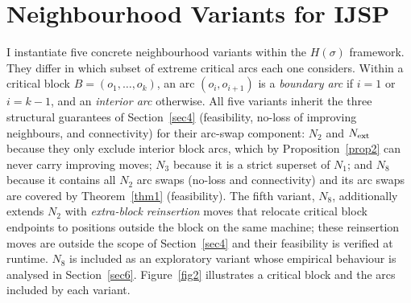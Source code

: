 \documentclass[preprint,12pt]{elsarticle}
\begin{document}
\section{Neighbourhood Variants for IJSP}
\label{sec5}

I instantiate five concrete neighbourhood variants within the $H(\sigma)$ framework. They differ in which subset of extreme critical arcs each one considers. Within a critical block $B = (o_1,\ldots,o_k)$, an arc $(o_i,o_{i+1})$ is a \emph{boundary arc} if $i=1$ or $i=k-1$, and an \emph{interior arc} otherwise. All five variants inherit the three structural guarantees of Section~\ref{sec4} (feasibility, no-loss of improving neighbours, and connectivity) for their arc-swap component: $N_2$ and $N_{\rm ext}$ because they only exclude interior block arcs, which by Proposition~\ref{prop2} can never carry improving moves; $N_3$ because it is a strict superset of $N_1$; and $N_8$ because it contains all $N_2$ arc swaps (no-loss and connectivity) and its arc swaps are covered by Theorem~\ref{thm1} (feasibility). The fifth variant, $N_8$, additionally extends $N_2$ with \emph{extra-block reinsertion} moves that relocate critical block endpoints to positions outside the block on the same machine; these reinsertion moves are outside the scope of Section~\ref{sec4} and their feasibility is verified at runtime. $N_8$ is included as an exploratory variant whose empirical behaviour is analysed in Section~\ref{sec6}. Figure~\ref{fig2} illustrates a critical block and the arcs included by each variant.
\end{document}
